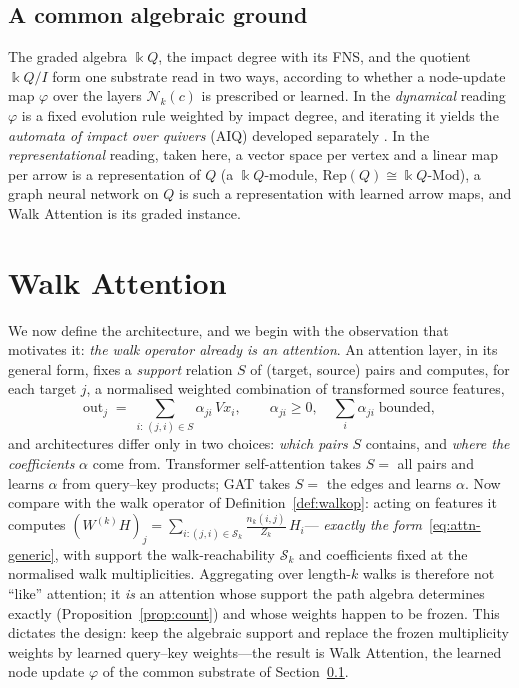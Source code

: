 \documentclass[runningheads]{llncs}
\newcommand{\kk}{\Bbbk}
\newcommand{\kQ}{\kk Q}
\begin{document}
\subsection{A common algebraic ground}\label{sec:ground}

The graded algebra $\kQ$, the impact degree with its FNS, and the quotient
$\kQ/I$ form one substrate read in two ways, according to whether a node-update
map $\varphi$ over the layers $\mathcal{N}_k(c)$ is prescribed or learned. In
the \emph{dynamical} reading $\varphi$ is a fixed evolution rule weighted by
impact degree, and iterating it yields the \emph{automata of impact over
quivers} (AIQ) developed separately
\cite{zainea2026aiq,ibanez2025casimulations}. In the \emph{representational}
reading, taken here, a vector space per vertex and a linear map per arrow is a
representation of $Q$ (a $\kQ$-module,
$\mathrm{Rep}(Q)\cong\kQ\text{-}\mathrm{Mod}$), a graph neural network on $Q$
is such a representation with learned arrow maps, and Walk Attention is its
graded instance.

\section{Walk Attention}\label{sec:model}

We now define the architecture, and we begin with the observation that
motivates it: \emph{the walk operator already is an attention}. An attention
layer, in its general form, fixes a \emph{support} relation $S$ of (target,
source) pairs and computes, for each target $j$, a normalised weighted
combination of transformed source features,
\begin{equation}\label{eq:attn-generic}
  \mathrm{out}_j \;=\; \sum_{i:\,(j,i)\in S}\alpha_{ji}\,Vx_i,
  \qquad \alpha_{ji}\ge0,\quad \textstyle\sum_{i}\alpha_{ji}\;\text{bounded},
\end{equation}
and architectures differ only in two choices: \emph{which pairs} $S$ contains,
and \emph{where the coefficients} $\alpha$ come from. Transformer
self-attention \cite{vaswani2017attention} takes $S=$ all pairs and learns
$\alpha$ from query--key products; GAT \cite{velickovic2017graph} takes $S=$
the edges and learns $\alpha$. Now compare with the walk operator of
Definition~\ref{def:walkop}: acting on features it computes
$(W^{(k)}H)_j=\sum_{i:(j,i)\in\mathcal{S}_k}\tfrac{n_k(i,j)}{Z_k}\,H_i$---
\emph{exactly the form}~\eqref{eq:attn-generic}, with support the
walk-reachability $\mathcal{S}_k$ and coefficients fixed at the normalised walk
multiplicities. Aggregating over length-$k$ walks is therefore not ``like''
attention; it \emph{is} an attention whose support the path algebra determines
exactly (Proposition~\ref{prop:count}) and whose weights happen to be frozen.
This dictates the design: keep the algebraic support and replace the frozen
multiplicity weights by learned query--key weights---the result is Walk
Attention, the learned node update $\varphi$ of the common substrate of
Section~\ref{sec:ground}.
\end{document}
